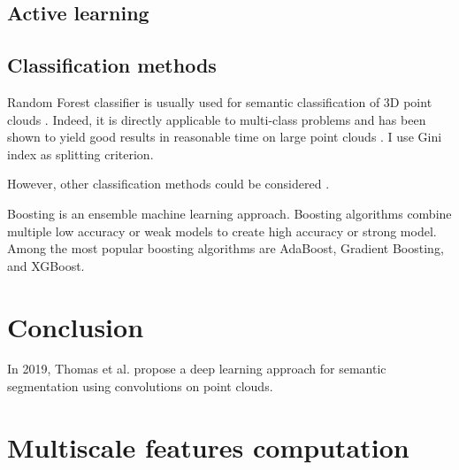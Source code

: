 \documentclass{article}
\begin{document}
\subsection{Active learning}

\subsection{Classification methods}\label{sec:classification}
Random Forest classifier is usually used for semantic classification of 3D point clouds \cite{thomas_semantic_2018,hackel_fast_nodate}. Indeed, it is directly applicable to multi-class problems and has been shown to yield good results in reasonable time on large point clouds \cite{weinmann_semantic_2015,atik_machine_2021}. I use Gini index as splitting criterion.

However, other classification methods could be considered \cite{atik_machine_2021}. 

Boosting is an ensemble machine learning approach. Boosting algorithms combine multiple low accuracy or weak models to create high accuracy or strong model. Among the most popular boosting algorithms are AdaBoost, Gradient Boosting, and XGBoost.

\section{Conclusion}

In 2019, Thomas et al. \cite{thomas_kpconv_2019} propose a deep learning approach for semantic segmentation using convolutions on point clouds.

\medskip



\appendix

\section{Multiscale features computation}
\end{document}
